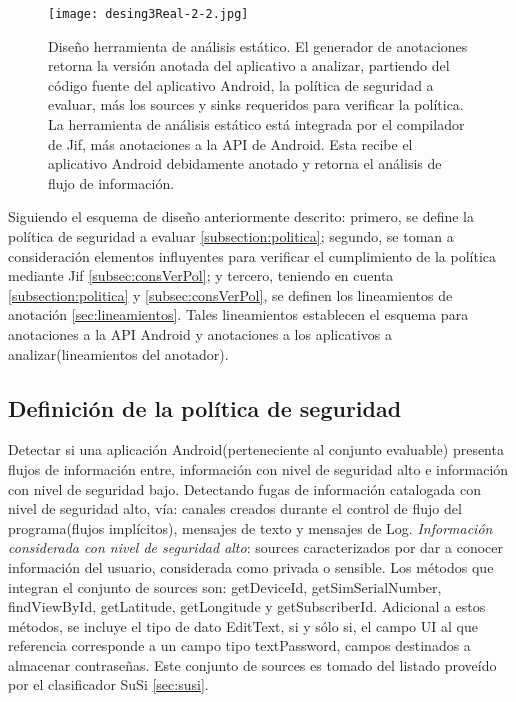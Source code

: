 \begin{figure}[t!]
	\begin{center} 
	\texttt{[image: desing3Real-2-2.jpg]} 
	\end{center}
	\caption{Diseño herramienta de análisis estático. 
	El generador de anotaciones retorna la versión anotada del aplicativo a
	analizar, partiendo del código fuente del aplicativo Android, la
	política de seguridad a evaluar, más los sources y sinks requeridos para
	verificar la política. La herramienta de análisis estático está integrada por
	el compilador de Jif, más anotaciones a la API de Android. Esta recibe el
	aplicativo Android debidamente anotado y retorna el análisis de flujo de
	información.}
	\label{fig:desingReal}
\end{figure}

Siguiendo el esquema de diseño anteriormente descrito: primero, se define la
política de seguridad a evaluar \ref{subsection:politica}; segundo, se toman a
consideración elementos influyentes para verificar el cumplimiento de la
política mediante Jif \ref{subsec:consVerPol}; y tercero, teniendo en cuenta
\ref{subsection:politica} y \ref{subsec:consVerPol}, se definen los lineamientos
de anotación \ref{sec:lineamientos}. Tales lineamientos establecen el esquema
para anotaciones a la API Android y anotaciones a los aplicativos a
analizar(lineamientos del anotador).

\subsection{Definición de la política de seguridad}
Detectar si una aplicación Android(perteneciente al conjunto evaluable) presenta
flujos de información entre, información con nivel de seguridad alto e
información con nivel de seguridad bajo.\newline
Detectando fugas de información catalogada con nivel de seguridad alto, vía:
canales creados durante el control de flujo del programa(flujos implícitos),
mensajes de texto y mensajes de Log.\newline 
\textit{Información considerada con nivel de seguridad alto}: sources
caracterizados por dar a conocer información del usuario, considerada como
privada o sensible. Los métodos que integran el conjunto de sources son:
getDeviceId, getSimSerialNumber, findViewById, getLatitude, getLongitude y
getSubscriberId. Adicional a estos métodos, se incluye el tipo de dato EditText,
si y sólo si, el campo UI al que referencia corresponde a un campo tipo
textPassword, campos destinados a almacenar contraseñas.\newline 
Este conjunto de sources es tomado del listado proveído por el clasificador SuSi \ref{sec:susi}.


